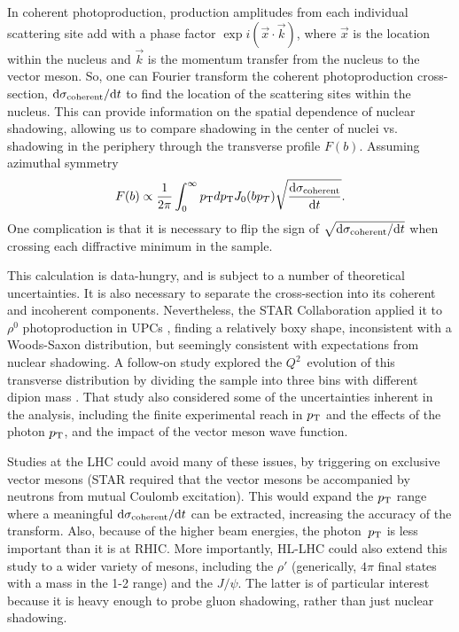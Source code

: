 \documentclass[../report.tex]{subfiles}
\begin{document}

In coherent photoproduction, production amplitudes from each individual scattering site add with a phase factor $\exp{i(\vec{x}\cdot\vec{k})}$, where $\vec{x}$ is the location within the nucleus and $\vec{k}$ is the momentum transfer from the nucleus to the vector meson.  So, one can Fourier transform the coherent photoproduction cross-section, $\mathrm{d}\sigma_{\rm coherent}/\mathrm{d} t$ to find the location of the scattering sites within the nucleus.  This can provide information on the spatial dependence of nuclear shadowing, allowing us to compare shadowing in the center of nuclei vs. shadowing in the periphery through the transverse profile $F(b)$.   Assuming azimuthal symmetry \cite{Diehl,Toll:2012mb}
\begin{equation}
F(b) \propto \frac{1}{2\pi} \int_0^\infty  p\sb{\scriptstyle\mathrm{T}} dp\sb{\scriptstyle\mathrm{T}} J_0(b p_T) \sqrt{\frac{\mathrm{d}\sigma_{\rm coherent}}{\mathrm{d} t}}.
\end{equation}
One complication is that it is necessary to flip the sign of $\sqrt{\mathrm{d}\sigma_{\rm coherent}/\mathrm{d} t}$ when crossing each diffractive minimum in the sample.

This calculation is  data-hungry, and is subject to a number of theoretical uncertainties.  It is also necessary to separate the cross-section into its coherent and incoherent components.  Nevertheless, the STAR Collaboration applied it to $\rho^0$ photoproduction in UPCs \cite{Adamczyk:2017vfu}, finding a relatively boxy shape, inconsistent with a Woods-Saxon distribution, but seemingly consistent with expectations from nuclear shadowing.   A follow-on study explored the  $Q^2$~evolution of this transverse distribution by dividing the sample into three bins with different dipion mass \cite{Klein:2018grn}.  That study also considered some of the uncertainties inherent in the analysis, including the finite experimental reach in $p\sb{\scriptstyle\mathrm{T}}$ and the effects of the photon $p\sb{\scriptstyle\mathrm{T}}$, and the impact of the vector meson wave function. 

Studies at the LHC could avoid many of these issues, by triggering on exclusive vector mesons (STAR required that the vector mesons be accompanied by neutrons from mutual Coulomb excitation).  This would expand the $p\sb{\scriptstyle\mathrm{T}}$ range where a meaningful $\mathrm{d} \sigma_{\rm coherent}/\mathrm{d} t$ can be extracted, increasing the accuracy of the transform.  Also, because of the higher beam energies, the photon~$p\sb{\scriptstyle\mathrm{T}}$ is less important than it is at RHIC.    More importantly, HL-LHC could also extend this study to a wider variety of mesons, including the $\rho'$ (generically, $4\pi$ final states with a mass in the 1-2 \UGeVcc range) and the $J/\psi$.  The latter is of particular interest because it is heavy enough to probe gluon shadowing, rather than just nuclear shadowing.  
\end{document}
